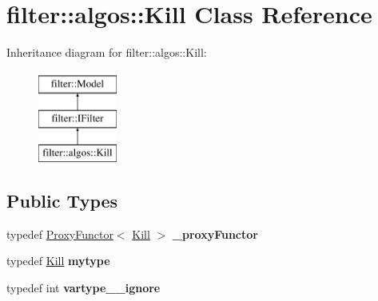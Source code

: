 \hypertarget{classfilter_1_1algos_1_1_kill}{}\section{filter\+:\+:algos\+:\+:Kill Class Reference}
\label{classfilter_1_1algos_1_1_kill}
Inheritance diagram for filter\+:\+:algos\+:\+:Kill\+:\begin{figure}[H]
\begin{center}
\leavevmode
\includegraphics[height=3.000000cm]{d8/db9/classfilter_1_1algos_1_1_kill}
\end{center}
\end{figure}
\subsection*{Public Types}
\begin{DoxyCompactItemize}
\item 
\mbox{\label{classfilter_1_1algos_1_1_kill_ae7f6e2b08097a855c64f427c400d046a}} 
typedef \hyperlink{class_proxy_functor}{Proxy\+Functor}$<$ \hyperlink{classfilter_1_1algos_1_1_kill}{Kill} $>$ {\bfseries \+\_\+proxy\+Functor}
\item 
\mbox{\label{classfilter_1_1algos_1_1_kill_aba21887088d6f51ef4640687a79adf10}} 
typedef \hyperlink{classfilter_1_1algos_1_1_kill}{Kill} {\bfseries mytype}
\item 
\mbox{\label{classfilter_1_1algos_1_1_kill_ad4319d9b8fb633fa26ac515ee0e14762}} 
typedef int {\bfseries vartype\+\_\+\+\_\+ignore}
\end{DoxyCompactItemize}

